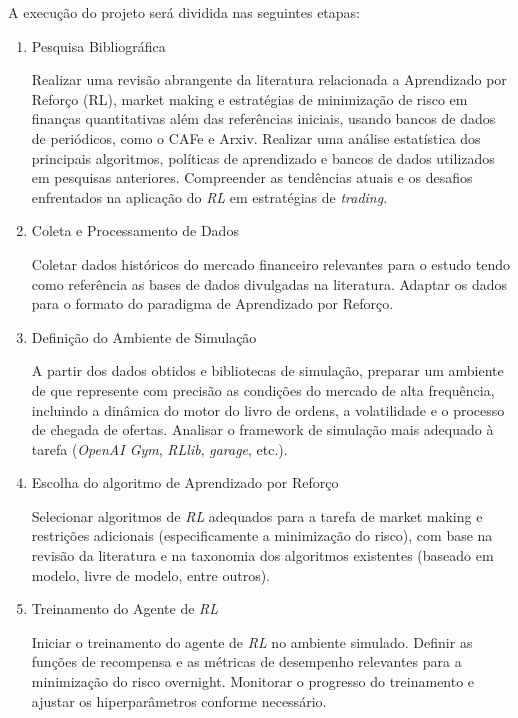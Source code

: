
A execução do projeto será dividida nas seguintes etapas:

\begin{enumerate}

\item Pesquisa Bibliográfica \label{item:bibliography_review}

Realizar uma revisão abrangente da literatura relacionada a Aprendizado por Reforço (RL), market making e estratégias de minimização de risco em finanças quantitativas além das referências iniciais, usando bancos de dados de periódicos, como o CAFe e Arxiv.
Realizar uma análise estatística dos principais algoritmos, políticas de aprendizado e bancos de dados utilizados em pesquisas anteriores.
Compreender as tendências atuais e os desafios enfrentados na aplicação do \textit{RL} em estratégias de \textit{trading}.

\item Coleta e Processamento de Dados \label{item:data}

Coletar dados históricos do mercado financeiro relevantes para o estudo tendo como referência as bases de dados divulgadas na literatura.
Adaptar os dados para o formato do paradigma de Aprendizado por Reforço.

\item Definição do Ambiente de Simulação \label{item:environment}

A partir dos dados obtidos e bibliotecas de simulação, preparar um ambiente de que represente com precisão as condições do mercado de alta frequência, incluindo a dinâmica do motor do livro de ordens, a volatilidade e o processo de chegada de ofertas. Analisar o framework de simulação mais adequado à tarefa (\textit{OpenAI Gym}, \textit{RLlib}, \textit{garage}, etc.).

\item Escolha do algoritmo de Aprendizado por Reforço \label{item:agent}

Selecionar algoritmos de \textit{RL} adequados para a tarefa de market making e restrições adicionais (especificamente a minimização do risco), com base na revisão da literatura e na taxonomia dos algoritmos existentes (baseado em modelo, livre de modelo, entre outros).

\item Treinamento do Agente de \textit{RL} \label{item:training}

Iniciar o treinamento do agente de \textit{RL} no ambiente simulado. Definir as funções de recompensa e as métricas de desempenho relevantes para a minimização do risco overnight. Monitorar o progresso do treinamento e ajustar os hiperparâmetros conforme necessário.


\end{enumerate}

